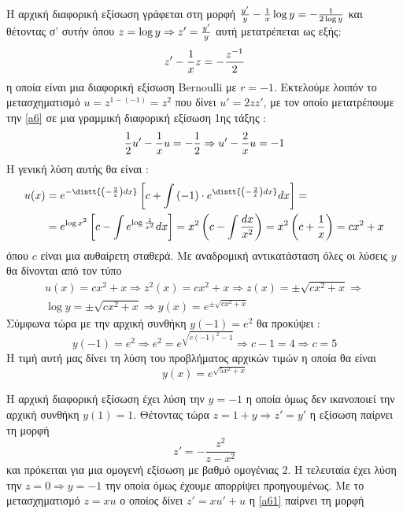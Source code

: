 \documentclass[a4paper,twoside,11pt]{book}
\DeclareRobustCommand{\frac}[3][0pt]{%
{\begingroup\hspace{#1}#2\hspace{#1}\endgroup\over\hspace{#1}#3\hspace{#1}}}
\begin{document}
\begin{rlist}
\item Η αρχική διαφορική εξίσωση γράφεται στη μορφή
$ \frac{y'}{y}-\frac{1}{x}\log{y}=-\frac{1}{2\log{y}} $ και θέτοντας σ' συτήν όπου $ z=\log{y}\Rightarrow z'=\frac{y'}{y} $ αυτή μετατρέπεται ως εξής:
\begin{equation}\label{a6}
z'-\frac{1}{x}z=-\frac{z^{-1}}{2}
\end{equation}
η οποία είναι μια διαφορική εξίσωση Bernoulli με $ r=-1 $. Εκτελούμε λοιπόν το μετασχηματισμό $ u=z^{1-(-1)}=z^2 $ που δίνει $ u'=2zz' $, με τον οποίο μετατρέπουμε την \eqref{a6} σε μια γραμμική διαφορική εξίσωση 1ης τάξης :
\begin{equation}
\frac{1}{2}u'-\frac{1}{x}u=-\frac{1}{2}\Rightarrow u'-\frac{2}{x}u=-1
\end{equation}
Η γενική λύση αυτής θα είναι :
\begin{align*}
u(x)&=e^{-\dintt{\left(-\frac{2}{x}\right) dx}}\left[c+\int{(-1)\cdot e^{\dintt{\left( -\frac{2}{x}\right) dx}}dx} \right]=\\
&=e^{\log{x^2}}\left[c-\int{e^{\log{\frac{1}{x^2}}}dx}\right]=x^2\left( c-\int{\dfrac{dx}{x^2}}\right)=x^2\left(c+\frac{1}{x} \right)=cx^2+x
\end{align*}
όπου $ c $ είναι μια αυθαίρετη σταθερά. Με αναδρομική αντικατάσταση όλες οι λύσεις $ y $ θα δίνονται από τον τύπο
\begin{gather}
u(x)=cx^2+x\Rightarrow z^2(x)=cx^2+x\Rightarrow z(x)=\pm\sqrt{cx^2+x}\Rightarrow\\
\log{y}=\pm\sqrt{cx^2+x}\Rightarrow y(x)=e^{\pm\sqrt{cx^2+x}}
\end{gather}
Σύμφωνα τώρα με την αρχική συνθήκη $ y(-1)=e^2 $ θα προκύψει :
\[ y(-1)=e^2\Rightarrow e^2=e^{\sqrt{c(-1)^2-1}}\Rightarrow c-1=4\Rightarrow c=5 \]
Η τιμή αυτή μας δίνει τη λύση του προβλήματος αρχικών τιμών η οποία θα είναι 
\[ y(x)=e^{\sqrt{5x^2+x}} \]
\item Η αρχική διαφορική εξίσωση έχει λύση την $ y=-1 $  η οποία όμως δεν ικανοποιεί την αρχική συνθήκη $ y(1)=1 $. Θέτοντας τώρα $ z=1+y\Rightarrow z'=y' $ η εξίσωση παίρνει τη μορφή 
\begin{equation}\label{a61}
z'=-\dfrac{z^2}{z-x^2}
\end{equation}  και πρόκειται για μια ομογενή εξίσωση με βαθμό ομογένιας $ 2 $. Η τελευταία έχει λύση την $ z=0\Rightarrow y=-1 $ την οποία όμως έχουμε απορρίψει προηγουμένως. Με το μετασχηματισμό $ z=xu $ ο οποίος δίνει $ z'=xu'+u $ η \eqref{a61} παίρνει τη μορφή
\begin{align}\label{a2}

\end{align}
\end{rlist}
\end{document}
